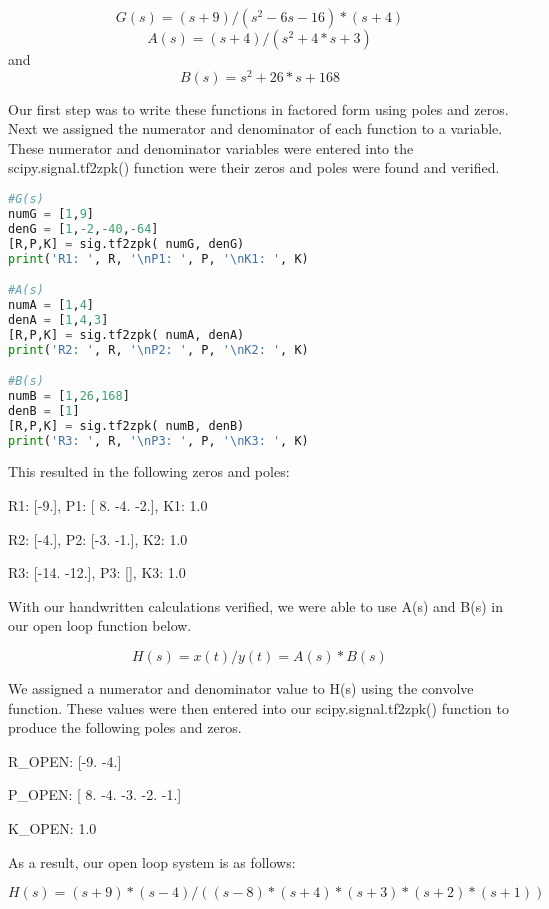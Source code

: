\documentclass[12pt]{report}
\begin{document}
$$G(s) = (s + 9)/ (s{^2}-6s-16)*(s + 4) $$
\vspace{-.5cm}
$$A(s) =( s + 4)/( s{^2} + 4*s + 3)$$
\vspace{-.5cm}
and $$B(s) = s{^2} + 26*s + 168$$

Our first step was to write these functions in factored form using poles and zeros. Next we assigned the numerator and denominator of each function to a variable. These numerator and denominator variables were entered into the scipy.signal.tf2zpk() function were their zeros and poles were found and verified.  

\begin{lstlisting}[language=Python, caption= Factored form]
#G(s)
numG = [1,9]
denG = [1,-2,-40,-64]
[R,P,K] = sig.tf2zpk( numG, denG)
print('R1: ', R, '\nP1: ', P, '\nK1: ', K)

#A(s)
numA = [1,4]
denA = [1,4,3]
[R,P,K] = sig.tf2zpk( numA, denA)
print('R2: ', R, '\nP2: ', P, '\nK2: ', K)

#B(s)
numB = [1,26,168]
denB = [1]
[R,P,K] = sig.tf2zpk( numB, denB)
print('R3: ', R, '\nP3: ', P, '\nK3: ', K)
\end{lstlisting}
\vspace{.5cm}

This resulted in the following zeros and poles:
\vspace{.5 cm}

R1:  [-9.],         P1:  [ 8. -4. -2.],     K1:  1.0\par
R2:  [-4.],         P2:  [-3. -1.],         K2:  1.0\par
R3:  [-14. -12.],   P3:  [],                K3:  1.0\par
\vspace{.5cm}
With our handwritten calculations verified, we were able to use A(s) and B(s) in our open loop function below.

$$H(s) = x(t)/y(t) = A(s)*B(s)$$

We assigned a numerator and denominator value to H(s) using the convolve function. These values were then entered into our scipy.signal.tf2zpk() function to produce the following poles and zeros.

R\_OPEN:  [-9. -4.] \par
P\_OPEN:  [ 8. -4. -3. -2. -1.] \par
K\_OPEN:  1.0\par
\vspace{.5cm}
As a result, our open loop system is as follows:

$$H(s) = (s+9)*(s-4) / ((s-8)*(s+4)*(s+3)*(s+2)*(s+1))$$
\end{document}
